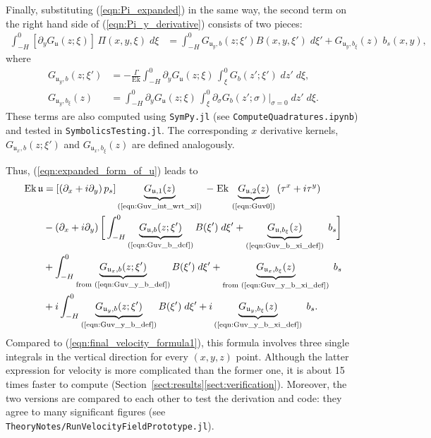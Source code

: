\documentclass{ametsocV6.2}
\begin{document}
Finally, substituting (\ref{eqn:Pi_expanded}) in the same way, the second term on the right hand side of (\ref{eqn:Pi_y_derivative}) consists of two pieces:
\begin{align}
\int_{-H}^{0} \left[ \partial_y G_{ \mathfrak{u}} ( z; \xi) \right] \, \Pi (x,y, \xi) \; d \xi 
& = 
\int_{-H}^{0} G_{ \mathfrak{u}_y, b} ( z; \xi')  B(x,y,\xi') \; d \xi'
+ G_{ \mathfrak{u}_y, {b_\xi}} ( z) \; b_s(x,y) ,
\label{eqn:Guv_y_b_and_Guv_y_b_xi_term}
\end{align}
where
\begin{align}
G_{ \mathfrak{u}_y, b} ( z; \xi') & = 
 - \frac{\Gamma}{\mathrm{Ek}} \int_{-H}^{0} \partial_y  G_{ \mathfrak{u}} ( z; \xi) \, \int_{\xi}^{0}  G_b(z'; \xi') \; dz'  \; d \xi , 
 \label{eqn:Guv_y_b_def} \\
G_{ \mathfrak{u}_y, {b_\xi}} ( z)  & = \int_{-H}^{0}  \partial_y G_{ \mathfrak{u}} ( z; \xi) \, \int_{\xi}^{0} \partial_\sigma G_b(z';\sigma) |_{\sigma = 0} \; dz'  \; d \xi .
\label{eqn:Guv_y_b_xi_def}
\end{align}
These terms are also computed using \texttt{SymPy.jl} (see \texttt{ComputeQuadratures.ipynb}) and tested in \texttt{SymbolicsTesting.jl}.
The corresponding $x$ derivative kernels, $G_{ \mathfrak{u}_x, b} ( z; \xi')$ and $G_{ \mathfrak{u}_x, {b_\xi}} (z)$ are defined analogously.

Thus, (\ref{eqn:expanded_form_of_u}) leads to
\begin{align}
\mathrm{Ek} \, \mathfrak{u}
& = \left[ \left(\partial_x  + i \partial_y \right) p_s  \right] \underbrace{G_{\mathfrak{u},1} (z)}_{\text{(\ref{eqn:Guv_int_wrt_xi})}} 
\; - \; \mathrm{Ek} \, \underbrace{G_{\mathfrak{u},2} (z)}_{\text{(\ref{eqn:Guv0})}}  \left( \tau^x + i \tau^y \right)  \nonumber \\
& - \left( \partial_x + i \partial_y \right) \bigg[ \int_{-H}^{0} \underbrace{G_{ \mathfrak{u}, b} ( z; \xi')}_{\text{(\ref{eqn:Guv_b_def})}}  B(\xi') \; d \xi' 
+ \underbrace{G_{ \mathfrak{u}, {b_\xi}} ( z)}_{\text{(\ref{eqn:Guv_b_xi_def})}} \; b_s \bigg] \nonumber \\
& + \int_{-H}^{0} \underbrace{G_{ \mathfrak{u}_x, b} ( z; \xi') }_{\text{from (\ref{eqn:Guv_y_b_def})}} B(\xi') \; d \xi'
+ \underbrace{G_{ \mathfrak{u}_x, {b_\xi}} ( z)}_{\text{from (\ref{eqn:Guv_y_b_xi_def})}} \; b_s \nonumber \\
& + i \int_{-H}^{0} \underbrace{G_{ \mathfrak{u}_y, b} ( z; \xi') }_{\text{(\ref{eqn:Guv_y_b_def})}} B(\xi') \; d \xi'
+ i \underbrace{G_{ \mathfrak{u}_y, {b_\xi}} ( z)}_{\text{(\ref{eqn:Guv_y_b_xi_def})}} \; b_s .
\label{eqn:final_velocity_formula2}
\end{align}
Compared to (\ref{eqn:final_velocity_formula1}), this formula involves three single integrals in the vertical direction for every $(x,y,z)$ point. 
Although the latter expression for velocity is more complicated than the former one, it is about 15 times faster to compute (Section~\ref{sect:results}\ref{sect:verification}).
Moreover, the two versions are compared to each other to test the derivation and code: they agree to many significant figures (see \texttt{TheoryNotes/RunVelocityFieldPrototype.jl}).
\end{document}
